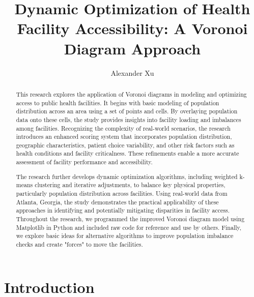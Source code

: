 \documentclass{article}
\title{Dynamic Optimization of Health Facility Accessibility: A Voronoi Diagram Approach}
\author{Alexander Xu}
\begin{document}
\maketitle

\begin{abstract}
This research explores the application of Voronoi diagrams in modeling and optimizing access to public health facilities. It begins with basic modeling of population distribution across an area using a set of points and cells. By overlaying population data onto these cells, the study provides insights into facility loading and imbalances among facilities. Recognizing the complexity of real-world scenarios, the research introduces an enhanced scoring system that incorporates population distribution, geographic characteristics, patient choice variability, and other risk factors such as health conditions and facility criticalness. These refinements enable a more accurate assessment of facility performance and accessibility.

The research further develops dynamic optimization algorithms, including weighted k-means clustering and iterative adjustments, to balance key physical properties, particularly population distribution across facilities. Using real-world data from Atlanta, Georgia, the study demonstrates the practical applicability of these approaches in identifying and potentially mitigating disparities in facility access. Throughout the research, we programmed the improved Voronoi diagram model using Matplotlib in Python and included raw code for reference and use by others. Finally, we explore basic ideas for alternative algorithms to improve population imbalance checks and create "forces" to move the facilities.
\end{abstract}


\section{Introduction}
\end{document}
